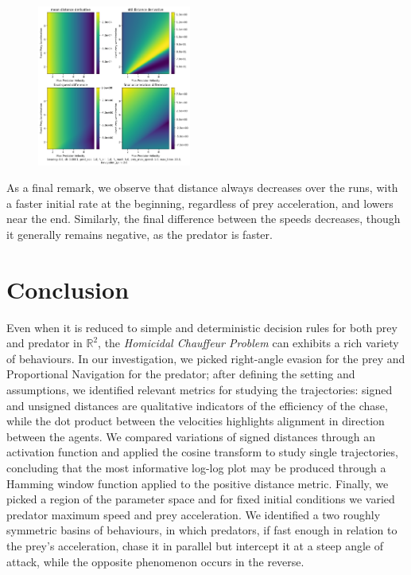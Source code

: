 \documentclass[10pt, twocolumn]{article}
\begin{document}
          \begin{figure}[H]
            \centering
            \includegraphics[width=0.45\textwidth]{figures/phase_derivative_dist.png}
            \label{fig:phaseplot3}
          \end{figure}

          As a final remark, we observe that distance always decreases over the runs, with a faster initial rate at the beginning, regardless of prey acceleration, and lowers near the end. Similarly, the final difference between the speeds decreases, though it generally remains negative, as the predator is faster.
          \section{Conclusion}
          Even when it is reduced to simple and deterministic decision rules for both prey and predator in $\mathbb{R}^2$, the \textit{Homicidal Chauffeur Problem} can exhibits a rich variety of behaviours. In our investigation, we picked right-angle evasion for the prey and Proportional Navigation for the predator; after defining the setting and assumptions, we identified relevant metrics for studying the trajectories: signed and unsigned distances are qualitative indicators of the efficiency of the chase, while the dot product between the velocities highlights alignment in direction between the agents. We compared variations of signed distances through an activation function and applied the cosine transform to study single trajectories, concluding that the most informative log-log plot may be produced through a Hamming window function applied to the positive distance metric. Finally, we picked a region of the parameter space and for fixed initial conditions we varied predator maximum speed and prey acceleration. We identified a two roughly symmetric basins of behaviours, in which predators, if fast enough in relation to the prey's acceleration, chase it in parallel but intercept it at a steep angle of attack, while the opposite phenomenon occurs in the reverse.
\end{document}
